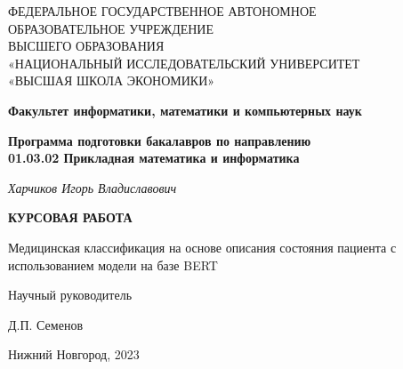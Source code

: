\thispagestyle{empty}

\begin{center}
    ФЕДЕРАЛЬНОЕ ГОСУДАРСТВЕННОЕ АВТОНОМНОЕ\\
    ОБРАЗОВАТЕЛЬНОЕ УЧРЕЖДЕНИЕ\\
    ВЫСШЕГО ОБРАЗОВАНИЯ\\
    «НАЦИОНАЛЬНЫЙ ИССЛЕДОВАТЕЛЬСКИЙ УНИВЕРСИТЕТ\\
    «ВЫСШАЯ ШКОЛА ЭКОНОМИКИ»
\end{center}

\vfill

\begin{center}
    \textbf{Факультет информатики, математики и компьютерных наук}

    \vspace{20pt}

    \textbf{Программа подготовки бакалавров по направлению \\
    01.03.02 Прикладная математика и информатика}
\end{center}

\vfill

\begin{center}
    \textit{Харчиков Игорь Владиславович} 
    
    \vspace{20pt}
    
    \textbf{КУРСОВАЯ РАБОТА}

    \vspace{20pt}
    
    Медицинская классификация на основе описания состояния пациента с использованием модели на базе BERT
\end{center}

\vfill

\begin{flushright}
Научный руководитель

\vspace{5pt}

Д.П. Семенов
\end{flushright}

\vfill

\begin{center}
    Нижний Новгород, 2023
\end{center}